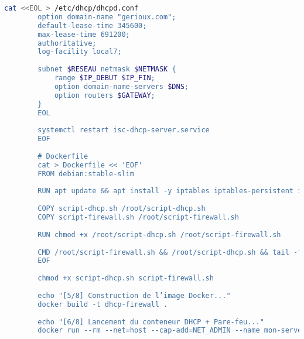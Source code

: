 \begin{lstlisting}[language=bash]
		cat <<EOL > /etc/dhcp/dhcpd.conf
		option domain-name "gerioux.com";
		default-lease-time 345600;
		max-lease-time 691200;
		authoritative;
		log-facility local7;
		
		subnet $RESEAU netmask $NETMASK {
			range $IP_DEBUT $IP_FIN;
			option domain-name-servers $DNS;
			option routers $GATEWAY;
		}
		EOL
		
		systemctl restart isc-dhcp-server.service
		EOF
		
		# Dockerfile
		cat > Dockerfile << 'EOF'
		FROM debian:stable-slim
		
		RUN apt update && apt install -y iptables iptables-persistent isc-dhcp-server net-tools nano systemctl
		
		COPY script-dhcp.sh /root/script-dhcp.sh
		COPY script-firewall.sh /root/script-firewall.sh
		
		RUN chmod +x /root/script-dhcp.sh /root/script-firewall.sh
		
		CMD /root/script-firewall.sh && /root/script-dhcp.sh && tail -f /dev/null
		EOF
		
		chmod +x script-dhcp.sh script-firewall.sh
		
		echo "[5/8] Construction de l’image Docker..."
		docker build -t dhcp-firewall .
		
		echo "[6/8] Lancement du conteneur DHCP + Pare-feu..."
		docker run --rm --net=host --cap-add=NET_ADMIN --name mon-serveur-dhcp dhcp-firewall
	\end{lstlisting}
	
